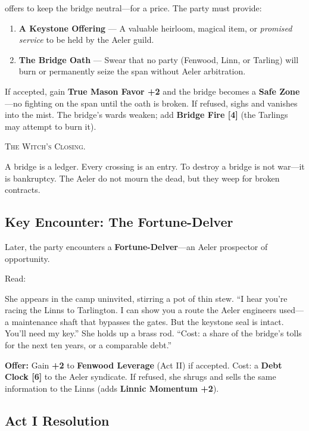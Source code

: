 \documentclass[11pt,a5paper]{book}
\newcommand{\clock}[1]{\textbf{[#1]}}
\newenvironment{witchclosing}
  {\begin{quoting}[font={small\itshape}, leftmargin=2em, rightmargin=2em]\noindent\textsc{The Witch's Closing.}\par}
  {\end{quoting}}
\begin{document}
\orin{} offers to keep the bridge neutral---for a price. The party must provide:
\begin{enumerate}[leftmargin=*]
\item \textbf{A Keystone Offering} --- A valuable heirloom, magical item, or \textit{promised service} to be held by the Aeler guild.
\item \textbf{The Bridge Oath} --- Swear that no party (Fenwood, Linn, or Tarling) will burn or permanently seize the span without Aeler arbitration.
\end{enumerate}

If accepted, gain \textbf{True Mason Favor +2} and the bridge becomes a \textbf{Safe Zone}---no fighting on the span until the oath is broken. If refused, \orin{} sighs and vanishes into the mist. The bridge's wards weaken; add \textbf{Bridge Fire \clock{4}} (the Tarlings may attempt to burn it).

\begin{witchclosing}
A bridge is a ledger. Every crossing is an entry. To destroy a bridge is not war---it is bankruptcy. The Aeler do not mourn the dead, but they weep for broken contracts.
\end{witchclosing}

\subsection*{Key Encounter: The Fortune-Delver}

Later, the party encounters a \textbf{Fortune-Delver}---an Aeler prospector of opportunity.

Read:
\begin{quoting}
She appears in the camp uninvited, stirring a pot of thin stew. ``I hear you're racing the Linns to Tarlington. I can show you a route the Aeler engineers used---a maintenance shaft that bypasses the gates. But the keystone seal is intact. You'll need my key.'' She holds up a brass rod. ``Cost: a share of the bridge's tolls for the next ten years, or a comparable debt.''
\end{quoting}

\textbf{Offer:} Gain \textbf{+2} to \textbf{Fenwood Leverage} (Act II) if accepted. Cost: a \textbf{Debt Clock \clock{6}} to the Aeler syndicate. If refused, she shrugs and sells the same information to the Linns (adds \textbf{Linnic Momentum +2}).

\subsection*{Act I Resolution}
\end{document}
